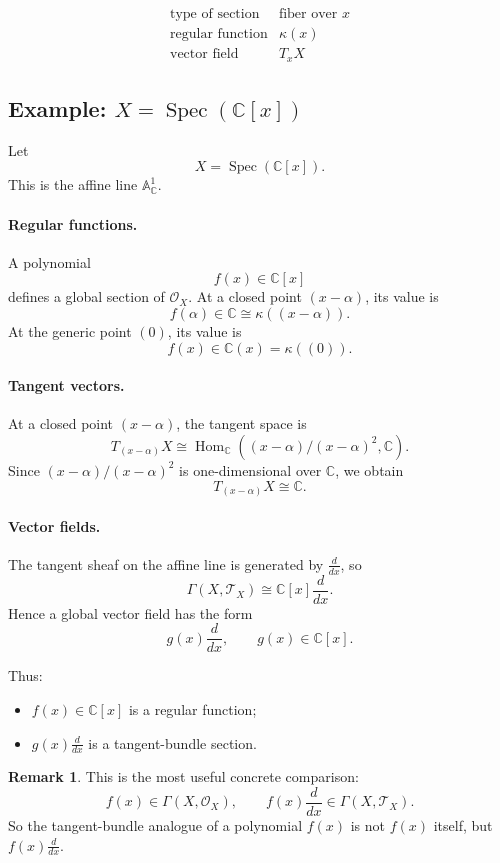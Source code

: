 \documentclass[11pt]{article}
\theoremstyle{definition}
\newtheorem{remark}[theorem]{Remark}
\newcommand{\C}{\mathbb{C}}
\newcommand{\Spec}{\operatorname{Spec}}
\newcommand{\kk}[1]{\kappa\!\left(#1\right)}
\begin{document}
\[
\begin{array}{c|c}
	\text{type of section} & \text{fiber over }x \\
	\hline
	\text{regular function} & \kk{x} \\
	\text{vector field} & T_xX
\end{array}
\]

\subsection{Example: \texorpdfstring{$X=\Spec(\C[x])$}{X=Spec(C[x])}}

Let
\[
X=\Spec(\C[x]).
\]
This is the affine line \(\mathbb A^1_\C\).

\paragraph{Regular functions.}
A polynomial
\[
f(x)\in \C[x]
\]
defines a global section of \(\mathcal O_X\).  
At a closed point \((x-\alpha)\), its value is
\[
f(\alpha)\in \C\cong \kk{(x-\alpha)}.
\]
At the generic point \((0)\), its value is
\[
f(x)\in \C(x)=\kk{(0)}.
\]

\paragraph{Tangent vectors.}
At a closed point \((x-\alpha)\), the tangent space is
\[
T_{(x-\alpha)}X
\cong
\operatorname{Hom}_\C\!\left((x-\alpha)/(x-\alpha)^2,\C\right).
\]
Since \((x-\alpha)/(x-\alpha)^2\) is one-dimensional over \(\C\), we obtain
\[
T_{(x-\alpha)}X\cong \C.
\]

\paragraph{Vector fields.}
The tangent sheaf on the affine line is generated by \(\frac{d}{dx}\), so
\[
\Gamma(X,\mathcal T_X)\cong \C[x]\frac{d}{dx}.
\]
Hence a global vector field has the form
\[
g(x)\frac{d}{dx},
\qquad g(x)\in \C[x].
\]

Thus:

\begin{itemize}
	\item \(f(x)\in \C[x]\) is a regular function;
	\item \(g(x)\frac{d}{dx}\) is a tangent-bundle section.
\end{itemize}

\begin{remark}
	This is the most useful concrete comparison:
	\[
	\boxed{
		f(x)\in \Gamma(X,\mathcal O_X),
		\qquad
		f(x)\frac{d}{dx}\in \Gamma(X,\mathcal T_X).
	}
	\]
	So the tangent-bundle analogue of a polynomial \(f(x)\) is not \(f(x)\) itself, but \(f(x)\frac{d}{dx}\).
\end{remark}
\end{document}
